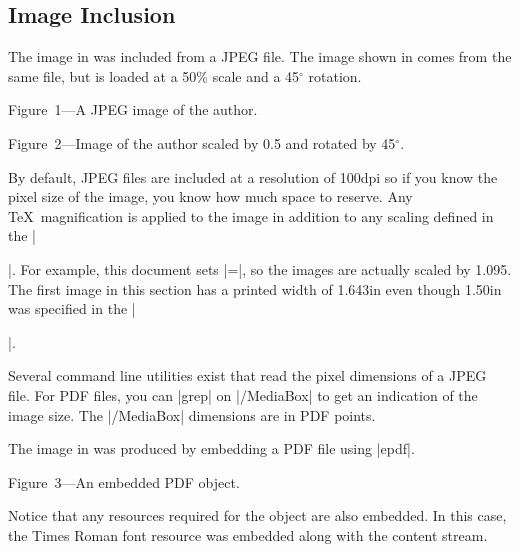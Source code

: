 {
\subsection{Image Inclusion}
 
The image in  was included from a JPEG file.
The image shown in  comes from the same file,
but is loaded at a 50\% scale and a 45$^\circ$ rotation.

\topinsert
{}
\bigskip
\centerline{}
\medskip
\centerline{\subheadingfont
\begincolor{\blue}Figure~1---A JPEG image of the author.\endcolor}
\bigskip
\endinsert

\topinsert
{}
\bigskip
\centerline{}
\medskip
\centerline{\subheadingfont
\begincolor{\blue}Figure~2---Image of the author scaled by 0.5 and rotated
by 45$^\circ$.%
\endcolor}
\bigskip
\endinsert

By default, JPEG files are included
at a resolution of 100dpi so if you know the pixel size
of the image, you know how much space to reserve.
Any \TeX\ magnification is applied to the image
in addition to any scaling defined in the |\special|.
For example, this document sets |\magnification=\magstephalf|,
so the images are actually scaled by 1.095.  The first
image in this section has a printed width of 1.643in
even though 1.50in was specified in the |\special|.

Several command line utilities exist that read
the pixel dimensions of a JPEG file.  For PDF files,
you can |grep| on |/MediaBox| to get an indication
of the image size.  The |/MediaBox| dimensions are
in PDF points.

The image in  was produced by embedding a PDF file
using |epdf|.

\topinsert
{}
\centerline{}
\medskip\centerline{\subheadingfont
\begincolor{\blue}Figure~3---An embedded PDF object.
\endcolor}
\endinsert
Notice that any resources required for the object
are also embedded.  In this case, the Times Roman font
resource was embedded along with the content stream.

}
